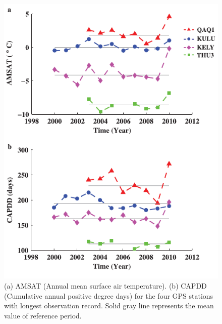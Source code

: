 \clearpage
\begin{figure}
 \centering
 \includegraphics{figs_chpt3/2012GC004432-p06.pdf} 
 \caption[(a) AMSAT (Annual mean surface air temperature). (b) CAPDD (Cumulative annual positive degree days) for the four GPS stations with longest observation record.]{(a) AMSAT (Annual mean surface air temperature). (b) CAPDD (Cumulative annual positive degree days) for the four GPS stations with longest observation record. Solid gray line represents the mean value of reference period.}
 \label{fig:fig6}
\end{figure}


